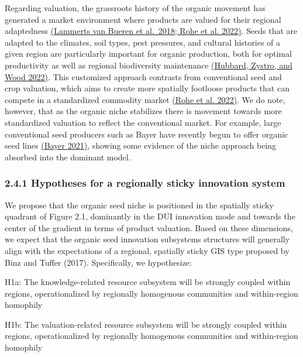 \documentclass[twoside,12pt,final]{ucthesis-CA2012}
\begin{document}
\begin{ucmainmatter}
Regarding valuation, the grassroots history of the organic movement has
generated a market environment where products are valued for their
regional adaptedness \href{https://www.zotero.org/google-docs/?T5KMY7}{(Lammerts van Bueren et al.~2018; Rohe et al.
2022)}. Seeds that are
adapted to the climates, soil types, pest pressures, and cultural
histories of a given region are particularly important for organic
production, both for optimal productivity as well as regional
biodiversity maintenance \href{https://www.zotero.org/google-docs/?0xuSfc}{(Hubbard, Zystro, and Wood
2022)}. This customized
approach contrasts from conventional seed and crop valuation, which aims
to create more spatially footloose products that can compete in a
standardized commodity market \href{https://www.zotero.org/google-docs/?YS9MQV}{(Rohe et al.
2022)}. We do note, however,
that as the organic niche stabilizes there is movement towards more
standardized valuation to reflect the conventional market. For example,
large conventional seed producers such as Bayer have recently begun to
offer organic seed lines \href{https://www.zotero.org/google-docs/?IcfSOF}{(Bayer
2021)}, showing some
evidence of the niche approach being absorbed into the dominant model.

\hypertarget{hypotheses-for-a-regionally-sticky-innovation-system}{%
\subsubsection{2.4.1 Hypotheses for a regionally sticky innovation system}\label{hypotheses-for-a-regionally-sticky-innovation-system}}

We propose that the organic seed niche is positioned in the \textquotesingle spatially
sticky\textquotesingle{} quadrant of Figure 2.1, dominantly in the DUI innovation mode
and towards the center of the gradient in terms of product valuation.
Based on these dimensions, we expect that the organic seed innovation
subsystems\textquotesingle{} structures will generally align with the expectations of a
regional, spatially sticky GIS type proposed by Binz and Tuffer (2017).
Specifically, we hypothesize:

H1a: The knowledge-related resource subsystem will be strongly coupled
within regions, operationalized by regionally homogenous communities and
within-region homophily

H1b: The valuation-related resource subsystem will be strongly coupled
within regions, operationalized by regionally homogenous communities and
within-region homophily


\end{ucmainmatter}
\end{document}
